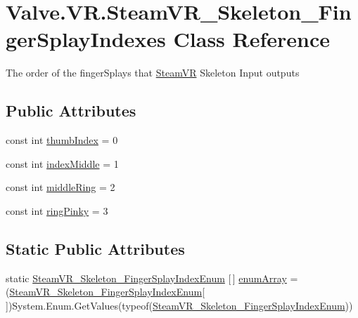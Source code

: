 \hypertarget{class_valve_1_1_v_r_1_1_steam_v_r___skeleton___finger_splay_indexes}{}\section{Valve.\+V\+R.\+Steam\+V\+R\+\_\+\+Skeleton\+\_\+\+Finger\+Splay\+Indexes Class Reference}
\label{class_valve_1_1_v_r_1_1_steam_v_r___skeleton___finger_splay_indexes}


The order of the finger\+Splays that \mbox{\hyperlink{class_valve_1_1_v_r_1_1_steam_v_r}{Steam\+VR}} Skeleton Input outputs  


\subsection*{Public Attributes}
\begin{DoxyCompactItemize}
\item 
const int \mbox{\hyperlink{class_valve_1_1_v_r_1_1_steam_v_r___skeleton___finger_splay_indexes_a595f94bfa71471df8bde2c21b9e9dcb0}{thumb\+Index}} = 0
\item 
const int \mbox{\hyperlink{class_valve_1_1_v_r_1_1_steam_v_r___skeleton___finger_splay_indexes_a6c462c7f0e9bea5f567a5dfe950e6b55}{index\+Middle}} = 1
\item 
const int \mbox{\hyperlink{class_valve_1_1_v_r_1_1_steam_v_r___skeleton___finger_splay_indexes_aec001b1e83e4e9a83247ab51af93034f}{middle\+Ring}} = 2
\item 
const int \mbox{\hyperlink{class_valve_1_1_v_r_1_1_steam_v_r___skeleton___finger_splay_indexes_ae8bf2e26f4c2fd97935d7cb9babb8d51}{ring\+Pinky}} = 3
\end{DoxyCompactItemize}
\subsection*{Static Public Attributes}
\begin{DoxyCompactItemize}
\item 
static \mbox{\hyperlink{namespace_valve_1_1_v_r_a43c97e13fe46f0575986b9f74945e0bf}{Steam\+V\+R\+\_\+\+Skeleton\+\_\+\+Finger\+Splay\+Index\+Enum}} \mbox{[}$\,$\mbox{]} \mbox{\hyperlink{class_valve_1_1_v_r_1_1_steam_v_r___skeleton___finger_splay_indexes_a2958ccd384d2746c80e59459fd8b63e2}{enum\+Array}} = (\mbox{\hyperlink{namespace_valve_1_1_v_r_a43c97e13fe46f0575986b9f74945e0bf}{Steam\+V\+R\+\_\+\+Skeleton\+\_\+\+Finger\+Splay\+Index\+Enum}}\mbox{[}$\,$\mbox{]})System.\+Enum.\+Get\+Values(typeof(\mbox{\hyperlink{namespace_valve_1_1_v_r_a43c97e13fe46f0575986b9f74945e0bf}{Steam\+V\+R\+\_\+\+Skeleton\+\_\+\+Finger\+Splay\+Index\+Enum}}))
\end{DoxyCompactItemize}


